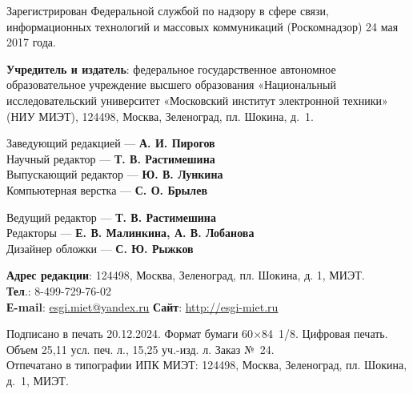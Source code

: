 \begin{flushleft}
\small
Зарегистрирован Федеральной службой по надзору в сфере связи, информационных технологий
и массовых коммуникаций (Роскомнадзор) 24 мая 2017 года.

\vspace{1em}
\textbf{Учредитель и издатель}: федеральное государственное автономное образовательное учреждение
высшего образования «Национальный исследовательский университет «Московский институт
электронной техники» (НИУ МИЭТ), 124498, Москва, Зеленоград, пл. Шокина, д. 1.
\end{flushleft}

\noindent
\begin{minipage}[t]{.48\textwidth}
    
    \begin{flushleft}
        \small
        Заведующий редакцией — \textbf{А. И. Пирогов}\\
        Научный редактор — \textbf{Т. В. Растимешина}\\
        Выпускающий редактор — \textbf{Ю. В. Лункина}\\
        Компьютерная верстка — \textbf{С. О. Брылев}
    \end{flushleft}
\end{minipage}\hspace{0.04\textwidth}
\begin{minipage}[t]{.48\textwidth}
    \begin{flushleft}
        \small
Ведущий редактор — \textbf{Т. В. Растимешина}\\
Редакторы — \textbf{Е. В. Малинкина, А. В. Лобанова}\\
Дизайнер обложки — \textbf{С. Ю. Рыжков}
    \end{flushleft}
\end{minipage}

\begin{flushleft}
    \small
    \textbf{Адрес редакции}: 124498, Москва, Зеленоград, пл. Шокина, д. 1, МИЭТ.\\
    \textbf{Тел}.: 8-499-729-76-02\\
    \textbf{Е-mail}: \href{mailto:esgi.miet@yandex.ru}{esgi.miet@yandex.ru} \hspace{3em}
    \textbf{Сайт}: \url{http://esgi-miet.ru}

     \vspace{1em}
    Подписано в печать 20.12.2024. Формат бумаги 60\(×\)84 1/8. Цифровая печать.\\
    Объем 25,11 усл. печ. л., 15,25 уч.-изд. л. Заказ № 24.\\
    Отпечатано в типографии ИПК МИЭТ: 124498, Москва, Зеленоград, пл. Шокина, д. 1, МИЭТ.
\end{flushleft}

\normalsize
\setmainlinespread
\blankpage